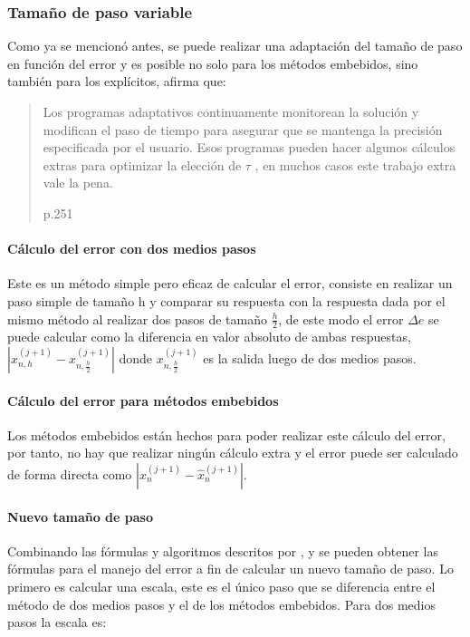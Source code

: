         \subsubsection{Tamaño de paso variable}

            Como ya se mencionó antes, se puede realizar una adaptación del tamaño de paso en función del error y es posible no solo para los métodos embebidos, sino también para los explícitos, \textcite{roganprogramacion} afirma que: \blockquote[p.251]{Los programas adaptativos continuamente monitorean la solución y modifican el paso de
            tiempo para asegurar que se mantenga la precisión especificada por el usuario. Esos programas
            pueden hacer algunos cálculos extras para optimizar la elección de $\tau$ , en muchos casos este
            trabajo extra vale la pena.}

            
            \paragraph{Cálculo del error con dos medios pasos}

                Este es un método simple pero eficaz de calcular el error, consiste en realizar un paso simple de tamaño h y comparar su respuesta con la respuesta dada por el mismo método al realizar dos pasos de tamaño $\frac{h}{2}$, de este modo el error $\Delta e$ se puede calcular como la diferencia en valor absoluto de ambas respuestas, $\left|x_{n,h}^{(j+1)} - x_{n,\frac{h}{2}}^{(j+1)}\right|$ donde $x_{n,\frac{h}{2}}^{(j+1)}$ es la salida luego de dos medios pasos.
            
            \paragraph{Cálculo del error para métodos embebidos} 

                Los métodos embebidos están hechos para poder realizar este cálculo del error, por tanto, no hay que realizar ningún cálculo extra y el error puede ser calculado de forma directa como $\left\lvert x_n^{(j+1)} - \hat{x}_n^{(j+1)} \right\rvert $.

            \paragraph{Nuevo tamaño de paso}

                Combinando las fórmulas y algoritmos descritos por \textcite{roganprogramacion}, \textcite{hairer1991solving} y \textcite{ritschel2013numerical} se pueden obtener las fórmulas para el manejo del error a fin de calcular un nuevo tamaño de paso. Lo primero es calcular una escala, este es el único paso que se diferencia entre el método de dos medios pasos y el de los métodos embebidos. Para dos medios pasos la escala es:

